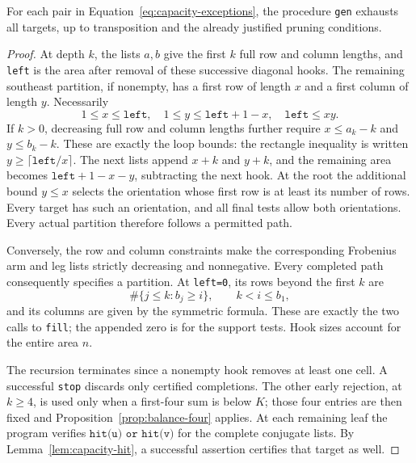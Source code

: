 \begin{lemma}
\label{lem:capacity-enumeration}
For each pair in Equation~\eqref{eq:capacity-exceptions}, the
procedure \texttt{gen} exhausts all targets, up to transposition and
the already justified pruning conditions.
\end{lemma}

\begin{proof}
At depth $k$, the lists $a,b$ give the first $k$ full row and column
lengths, and \texttt{left} is the area after removal of these
successive diagonal hooks. The remaining southeast partition, if
nonempty, has a first row of length $x$ and a first column of length
$y$. Necessarily
\[
 1\le x\le\texttt{left},\quad
 1\le y\le\texttt{left}+1-x,\quad
 \texttt{left}\le xy.
\]
If $k>0$, decreasing full row and column lengths further require
$x\le a_k-k$ and $y\le b_k-k$. These are exactly the loop bounds:
the rectangle inequality is written
$y\ge\lceil\texttt{left}/x\rceil$. The next lists append $x+k$
and $y+k$, and the remaining area becomes
$\texttt{left}+1-x-y$, subtracting the next hook.
At the root the additional bound $y\le x$ selects the orientation
whose first row is at least its number of rows. Every target has
such an orientation, and all final tests allow both orientations.
Every actual partition therefore follows a permitted path.

Conversely, the row and column constraints make the corresponding
Frobenius arm and leg lists strictly decreasing and nonnegative.
Every completed path consequently specifies a partition. At
\texttt{left=0}, its rows beyond the first $k$ are
\[
 \#\{j\le k:b_j\ge i\},\qquad k<i\le b_1,
\]
and its columns are given by the symmetric formula. These are
exactly the two calls to \texttt{fill}; the appended zero is for
the support tests. Hook sizes account for the entire area $n$.

The recursion terminates since a nonempty hook removes at least
one cell. A successful \texttt{stop} discards only certified
completions. The other early rejection, at $k\ge4$, is used only
when a first-four sum is below $K$; those four entries are then
fixed and Proposition~\ref{prop:balance-four} applies. At each remaining
leaf the program verifies
$\texttt{hit(u) or hit(v)}$ for the complete conjugate lists.
By Lemma~\ref{lem:capacity-hit}, a successful assertion certifies
that target as well.
\end{proof}

